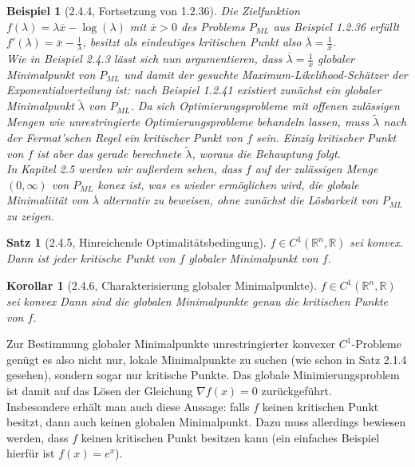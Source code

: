 \documentclass[12pt]{extreport} %
\newcommand{\R}{\mathbb{R}}
\theoremstyle{named}
\theoremstyle{nnamed}
\theoremstyle{itshape}
\newtheorem*{satz}{Satz}
\theoremstyle{normal}
\newtheorem*{beispiel}{Beispiel}
\newtheorem*{korollar}{Korollar}
\begin{document}
\begin{beispiel}[2.4.4, Fortsetzung von 1.2.36]
	Die Zielfunktion $f(\lambda) = \lambda \overline{x} - \log(\lambda)$ mit $\overline{x} > 0$ des Problems $P_{ML}$ aus Beispiel 1.2.36	erfüllt $f'(\lambda) = \overline{x} - \frac{1}{\lambda}$, besitzt als eindeutiges kritischen Punkt also $\overline{\lambda} = \frac{1}{\overline{x}}$. ~\\
	
	Wie in Beispiel 2.4.3 lässt sich nun argumentieren, dass $\overline{\lambda} = \frac{1}{\overline{x}}$ globaler Minimalpunkt von $P_{ML}$ und damit der gesuchte Maximum-Likelihood-Schätzer der Exponentialverteilung ist: nach Beispiel 1.2.41 existiert zunächst ein globaler Minimalpunkt $\tilde{\lambda}$ von $P_{ML}$. Da sich Optimierungsprobleme mit offenen zulässigen Mengen wie unrestringierte Optimierungsprobleme behandeln lassen, muss $\tilde{\lambda}$ nach der Fermat'schen Regel ein kritischer Punkt von $f$ sein. Einzig kritischer Punkt von $f$ ist aber das gerade berechnete $\tilde{\lambda}$, woraus die Behauptung folgt. ~\\
	
	In Kapitel 2.5 werden wir außerdem sehen, dass $f$ auf der zulässigen Menge $(0, \infty)$ von $P_{ML}$ konex ist, was es wieder ermöglichen wird, die globale Minimaliität von $\overline{\lambda}$ alternativ zu beweisen, ohne zunächst die Lösbarkeit von $P_{ML}$ zu zeigen.
\end{beispiel}


\begin{satz}[2.4.5, Hinreichende Optimalitätsbedingung]
	$f \in C^1(\R^n, \R)$ sei konvex. Dann ist jeder kritische Punkt von $f$ globaler Minimalpunkt von $f$.
\end{satz}

\begin{korollar}[2.4.6, Charakterisierung globaler Minimalpunkte]
	$f \in C^1(\R^n, \R)$ sei konvex	 Dann sind die globalen Minimalpunkte genau die kritischen Punkte von $f$.
\end{korollar}

Zur Bestimmung globaler Minimalpunkte unrestringierter konvexer $C^1$-Probleme genügt es also nicht nur, lokale Minimalpunkte zu suchen (wie schon in Satz 2.1.4 gesehen), sondern sogar nur kritische Punkte. Das globale Minimierungsproblem ist damit auf das Lösen der Gleichung $\nabla f(x) = 0$ zurückgeführt. ~\\

Insbesondere erhält man auch diese Aussage: falls $f$ keinen kritischen Punkt besitzt, dann auch keinen globalen Minimalpunkt. Dazu muss allerdings bewiesen werden, dass $f$ keinen kritischen Punkt besitzen kann (ein einfaches Beispiel hierfür ist $f(x) = e^x$).
\end{document}
